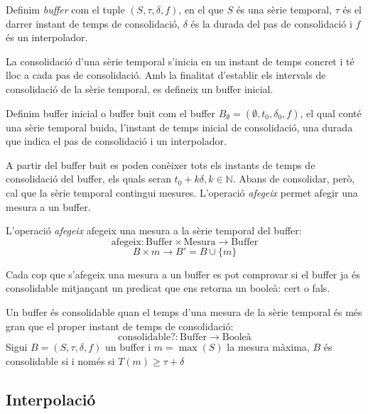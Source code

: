 \begin{definition}[Buffer]
  Definim \emph{buffer} com el tuple $(S,\tau,\delta,f)$, en el que
  $S$ és una sèrie temporal, $\tau$ és el darrer instant de temps de
  consolidació, $\delta$ és la durada del pas de consolidació i $f$ és
  un interpolador.
\end{definition}

La consolidació d'una sèrie temporal s'inicia en un instant de temps concret i té lloc a cada pas de consolidació. Amb la finalitat d'establir els intervals de consolidació de la sèrie temporal, es defineix un buffer inicial.

\begin{definition}\label{def:buffer_buit}
  Definim buffer inicial o buffer buit com el buffer $B_{\emptyset} =
  (\emptyset,t_0, \delta_0, f)$, el qual
  conté una sèrie temporal buida, l'instant de temps inicial de
  consolidació, una durada que indica el pas de consolidació i un
  interpolador.
\end{definition}

A partir del buffer buit es poden conèixer tots els instants de temps de consolidació del buffer, els quals seran $t_0+k\delta, k\in\mathbb{N}$. 
Abans de consolidar, però, cal que la sèrie temporal contingui mesures. L'operació \emph{afegeix} permet afegir una mesura a un buffer.

\begin{definition}
  L'operació \emph{afegeix} afegeix una mesura a la sèrie temporal del buffer:
  \[
  \text{afegeix}: \text{Buffer} \times \text{Mesura} \longrightarrow \text{Buffer}
  \]
  \[
   B \times m \longrightarrow B'= B \cup \{m\}
   \]
\end{definition}

Cada cop que s'afegeix una mesura a un buffer es pot comprovar si el buffer ja és consolidable mitjançant un predicat que ens retorna un booleà: cert o fals. 

\begin{definition}
  Un buffer és consolidable quan el temps d'una mesura de la sèrie temporal és més gran que el proper instant de temps de consolidació:
  \[
  \text{consolidable?}: \text{Buffer} \longrightarrow \text{Booleà}
  \]
  Sigui $B=(S,\tau,\delta,f)$ un buffer i $m=\max(S)$ la mesura màxima, $B$ és consolidable si i només si $T(m) \geq \tau+\delta$
\end{definition}


\subsection{Interpolació}
\label{sec:model:interpolador}


